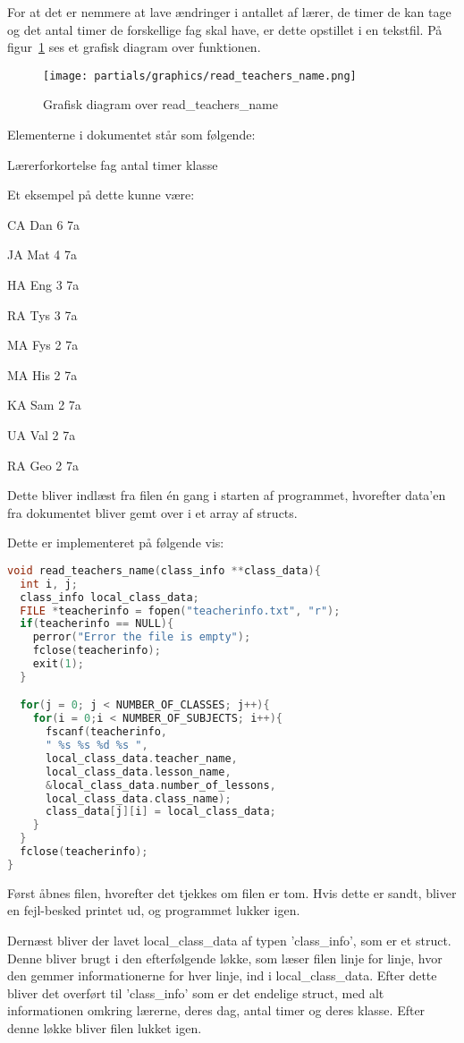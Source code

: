 For at det er nemmere at lave ændringer i antallet af lærer, de timer de kan tage og det antal timer de forskellige fag skal have, er dette opstillet i en tekstfil. På figur~\ref{fig:datacollect} ses et grafisk diagram over funktionen.
\begin{figure}[!h]
\texttt{[image: partials/graphics/read\_teachers\_name.png]}
\caption{Grafisk diagram over read\_teachers\_name}
\label{fig:datacollect}
\end{figure}
Elementerne i dokumentet står som følgende:

Lærerforkortelse fag antal timer klasse

Et eksempel på dette kunne være:

    CA Dan 6 7a

    JA Mat 4 7a

    HA Eng 3 7a

    RA Tys 3 7a

    MA Fys 2 7a

    MA His 2 7a

    KA Sam 2 7a

    UA Val 2 7a

    RA Geo 2 7a

Dette bliver indlæst fra filen én gang i starten af programmet, hvorefter data’en fra dokumentet bliver gemt over i et array af structs.

Dette er implementeret på følgende vis:

\begin{lstlisting}[language = c]
void read_teachers_name(class_info **class_data){ 
  int i, j;
  class_info local_class_data;
  FILE *teacherinfo = fopen("teacherinfo.txt", "r");
  if(teacherinfo == NULL){
    perror("Error the file is empty");
    fclose(teacherinfo);
    exit(1);
  }

  for(j = 0; j < NUMBER_OF_CLASSES; j++){
    for(i = 0;i < NUMBER_OF_SUBJECTS; i++){
      fscanf(teacherinfo,
      " %s %s %d %s ",
      local_class_data.teacher_name, 
      local_class_data.lesson_name, 
      &local_class_data.number_of_lessons, 
      local_class_data.class_name);
      class_data[j][i] = local_class_data;
    } 
  }  
  fclose(teacherinfo);
}
\end{lstlisting}

Først åbnes filen, hvorefter det tjekkes om filen er tom. Hvis dette er sandt, bliver en fejl-besked printet ud, og programmet lukker igen.

Dernæst bliver der lavet local\_class\_data af typen ’class\_info’, som er et struct. Denne bliver brugt i den efterfølgende løkke, som læser filen linje for linje, hvor den gemmer informationerne for hver linje, ind i local\_class\_data. Efter dette bliver det overført til ’class\_info’ som er det endelige struct, med alt informationen omkring lærerne, deres dag, antal timer og deres klasse. Efter denne løkke bliver filen lukket igen.